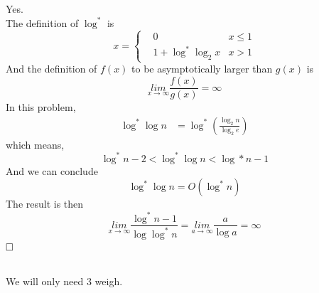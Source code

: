 \documentclass[A4paper]{article}
\newcommand{\qedhere}{$\hfill\ensuremath{\square}$}
\begin{document}
\subsection{}
Yes.\\
The definition of $\log ^*$ is 
\[
	x = \left\{
	\begin{aligned}
	&0 \ \ \ & x \leq 1\\
	&1 + \log^* \log_2 x & x > 1
	\end{aligned}
	\right.
\]
And the definition of $f(x)$ to be asymptotically larger than $g(x)$ is 
\[
	\underset{x\rightarrow \infty}{lim} \frac{f(x)}{g(x)} = \infty
\]
In this problem, \[
	\begin{aligned}
	\log^* \log n & = \log^* (\frac{\log_2 n}{\log_2e} )
	\end{aligned}
\]
which means,
\[
	\log^* n -2 <\log^* \log n < \log* n -1
\]
And we can conclude
\[
	\log^* \log n = O(\log^* n)
\]
The result is then
\[
	\underset{x\rightarrow \infty}{lim} \frac{\log^* n -1}{\log\log^* n} = \underset{a\rightarrow \infty}{lim} \frac{a}{\log a} = \infty
\]
\qedhere
\subsection{}
We will only need 3 weigh.
\begin{algorithm}
\end{algorithm}
\end{document}

